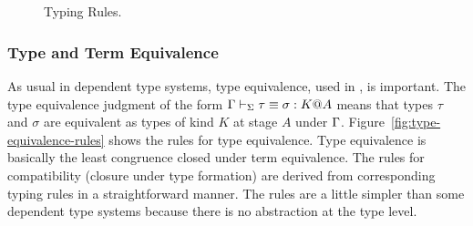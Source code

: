 \begin{figure}
    \begin{center}
         \\[2mm]
         \\[2mm]
         \\[2mm]
         \\[2mm]
         \\[2mm]
         \andalso
         \\[2mm]
         \\[2mm]
         \andalso
        \caption{Typing Rules.}
        \label{fig:typing-rules}
    \end{center}
\end{figure}

\subsubsection{Type and Term Equivalence}

As usual in dependent type systems, type equivalence, used in \TConv,
is important.  The type equivalence judgment of the form
$\Gamma \vdash_\Sigma \tau \equiv \sigma : K @ A$ means that types $\tau$ and $\sigma$
are equivalent as types of kind $K$ at stage $A$ under $\Gamma$.
Figure~\ref{fig:type-equivalence-rules} shows the rules for type
equivalence.  Type equivalence is basically the least congruence
closed under term equivalence.  The rules for compatibility (closure
under type formation) are derived from corresponding typing rules in a
straightforward manner.  The rules are a little simpler than some
dependent type systems   because there is no abstraction
at the type level.

